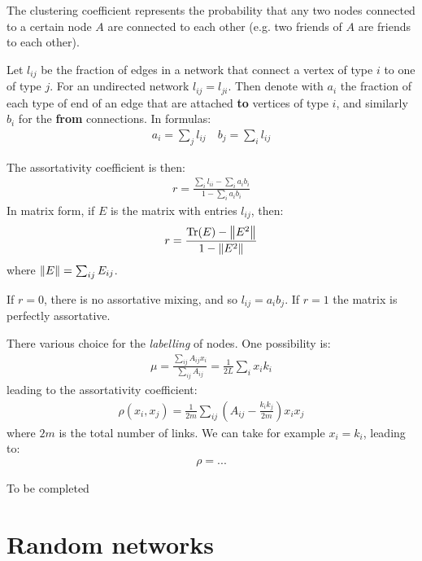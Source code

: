 \documentclass[../template.tex]{subfiles}
\begin{document}

The clustering coefficient represents the probability that any two nodes connected to a certain node $A$ are connected to each other (e.g. two friends of $A$ are friends to each other).

\medskip

Let $l_{ij}$ be the fraction of edges in a network that connect a vertex of type $i$ to one of type $j$. For an undirected network $l_{ij} = l_{ji}$. Then denote with $a_i$ the fraction of each type of end of an edge that are attached \textbf{to} vertices of type $i$, and similarly $b_i$ for the \textbf{from} connections. In formulas:
\begin{align*}
    a_i = \sum_j l_{ij} \quad b_j = \sum_i l_{ij}
\end{align*} 


The assortativity coefficient is then:
\begin{align*}
    r = \frac{ \sum_i l_{i i} - \sum_{i} a_i b_i}{ 1 - \sum_{i} a_i b_i}
\end{align*}
In matrix form, if $E$ is the matrix with entries $l_{ij}$, then:
\begin{align*}
    r = \frac{\operatorname{Tr}(E) - \norm{E^2} }{1 - \norm{E^2}} 
\end{align*}
where $\norm{E} = \sum_{ij} E_{ij}$.

\medskip

If $r=0$, there is no assortative mixing, and so $l_{ij} = a_i b_j$. If $r=1$ the matrix is perfectly assortative. 

\medskip

There various choice for the \textit{labelling} of nodes. One possibility is:
\begin{align*}
    \mu = \frac{\sum_{ij} A_{ij} x_i}{\sum_{ij} A_{ij}} = \frac{1}{2L} \sum_i x_i k_i 
\end{align*} 
leading to the assortativity coefficient:
\begin{align*}
    \rho(x_i, x_j) = \frac{1}{2m} \sum_{ij} \left(A_{ij} - \frac{k_i k_j}{2m} \right) x_i x_j
\end{align*}
where $2m$ is the total number of links. We can take for example $x_i = k_i$, leading to:
\begin{align*}
    \rho = ... 
\end{align*}

To be completed

\section{Random networks}
\end{document}
